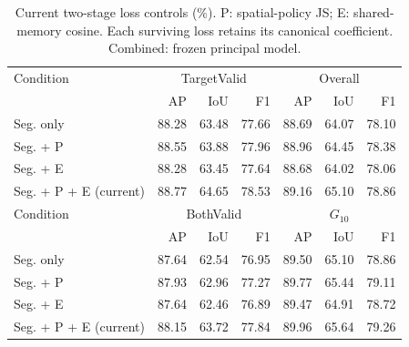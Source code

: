 \begin{table}[!t]
\caption{Current two-stage loss controls (\%). P: spatial-policy JS; E: shared-memory cosine. Each surviving loss retains its canonical coefficient. Combined: frozen principal model.}
\label{tab:loss_parts}
\centering\scriptsize
\setlength{\tabcolsep}{2.1pt}
\renewcommand{\arraystretch}{1.03}
\begin{tabular}{lrrrrrr}
\toprule
Condition & \multicolumn{3}{c}{TargetValid} & \multicolumn{3}{c}{Overall}\\
 & AP & IoU & F1 & AP & IoU & F1\\
\midrule
Seg. only & 88.28 & 63.48 & 77.66 & 88.69 & 64.07 & 78.10\\
Seg. + P & 88.55 & 63.88 & 77.96 & 88.96 & 64.45 & 78.38\\
Seg. + E & 88.28 & 63.45 & 77.64 & 88.68 & 64.02 & 78.06\\
Seg. + P + E (current) & 88.77 & 64.65 & 78.53 & 89.16 & 65.10 & 78.86\\
\midrule
Condition & \multicolumn{3}{c}{BothValid} & \multicolumn{3}{c}{$G_{10}$}\\
 & AP & IoU & F1 & AP & IoU & F1\\
\midrule
Seg. only & 87.64 & 62.54 & 76.95 & 89.50 & 65.10 & 78.86\\
Seg. + P & 87.93 & 62.96 & 77.27 & 89.77 & 65.44 & 79.11\\
Seg. + E & 87.64 & 62.46 & 76.89 & 89.47 & 64.91 & 78.72\\
Seg. + P + E (current) & 88.15 & 63.72 & 77.84 & 89.96 & 65.64 & 79.26\\
\bottomrule
\end{tabular}
\end{table}
